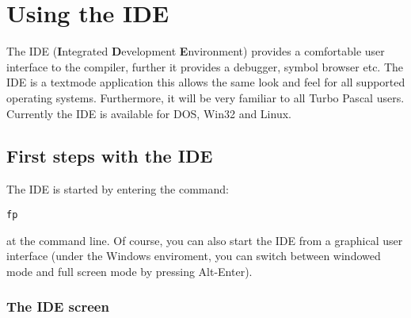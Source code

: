 %
%
%
%
%
\chapter{Using the IDE}

The IDE (\textbf{I}ntegrated \textbf{D}evelopment \textbf{E}nvironment)
provides a comfortable user interface to the compiler, further it
provides a debugger, symbol browser etc. The IDE is a textmode
application this allows the same look and feel for all supported
operating systems. Furthermore, it will be very familiar to all
Turbo Pascal users.
Currently the IDE is available for DOS, Win32 and Linux.

\section{First steps with the IDE}

The IDE is started by entering the command:
\begin{verbatim}
fp
\end{verbatim}
at the command line. Of course, you can also start the IDE
from a graphical user interface (under the Windows enviroment, you
can switch between windowed mode and full screen mode by pressing
Alt-Enter).

\subsection{The IDE screen}

